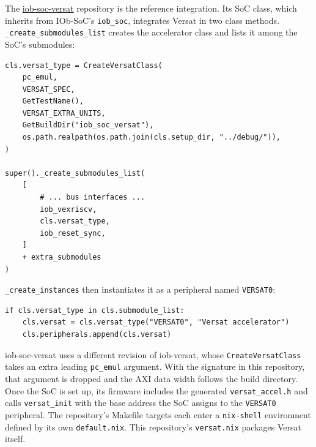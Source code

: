 The \href{https://github.com/IObundle/iob-soc-versat}{iob-soc-versat} repository is the reference integration. Its SoC class, which inherits from IOb-SoC's \texttt{iob\_soc}, integrates Versat in two class methods. \texttt{\_create\_submodules\_list} creates the accelerator class and lists it among the SoC's submodules:

\begin{lstlisting}[caption={iob\_soc\_versat.py}]
cls.versat_type = CreateVersatClass(
    pc_emul,
    VERSAT_SPEC,
    GetTestName(),
    VERSAT_EXTRA_UNITS,
    GetBuildDir("iob_soc_versat"),
    os.path.realpath(os.path.join(cls.setup_dir, "../debug/")),
)

super()._create_submodules_list(
    [
        # ... bus interfaces ...
        iob_vexriscv,
        cls.versat_type,
        iob_reset_sync,
    ]
    + extra_submodules
)
\end{lstlisting}

\texttt{\_create\_instances} then instantiates it as a peripheral named \texttt{VERSAT0}:

\begin{lstlisting}[caption={iob\_soc\_versat.py}]
if cls.versat_type in cls.submodule_list:
    cls.versat = cls.versat_type("VERSAT0", "Versat accelerator")
    cls.peripherals.append(cls.versat)
\end{lstlisting}

iob-soc-versat uses a different revision of iob-versat, whose \texttt{CreateVersatClass} takes an extra leading \texttt{pc\_emul} argument. With the signature in this repository, that argument is dropped and the AXI data width follows the build directory. Once the SoC is set up, its firmware includes the generated \texttt{versat\_accel.h} and calls \texttt{versat\_init} with the base address the SoC assigns to the \texttt{VERSAT0} peripheral. The repository's Makefile targets each enter a \texttt{nix-shell} environment defined by its own \texttt{default.nix}. This repository's \texttt{versat.nix} packages Versat itself.
